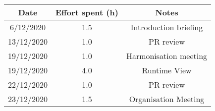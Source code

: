\documentclass[../../main.tex]{subfiles}
\begin{document}
\begin{center}
    \begin{tabular}{|c| |c| |c|} 
        \hline
        Date & Effort spent (h) & Notes\\ [0.5ex] 
        \hline\hline
        6/12/2020 & 1.5 & Introduction briefing\\ 
        13/12/2020 & 1.0 & PR review\\
        19/12/2020 & 1.0 & Harmonisation meeting\\
        19/12/2020 & 4.0 & Runtime View\\
        22/12/2020 & 1.0 & PR review\\
        23/12/2020 & 1.5 & Organisation Meeting\\
        \hline
    \end{tabular}
\end{center}
\end{document}
